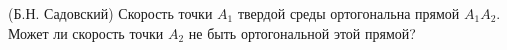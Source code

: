 (Б.Н. Садовский)
Скорость точки $A_{1}$ твердой среды ортогональна прямой $A_{1}A_{2}$. Может ли
скорость точки $A_{2}$ не быть ортогональной этой прямой?
